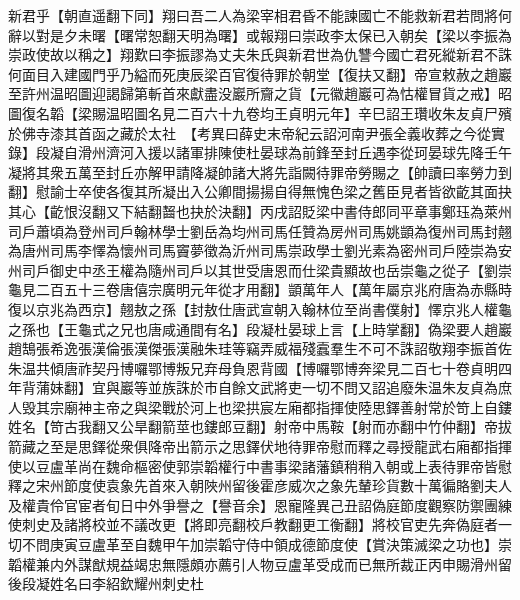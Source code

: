 新君乎【朝直遥翻下同】翔曰吾二人為梁宰相君昏不能諫國亡不能救新君若問將何辭以對是夕未曙【曙常恕翻天明為曙】或報翔曰崇政李太保已入朝矣【梁以李振為崇政使故以稱之】翔歎曰李振謬為丈夫朱氏與新君世為仇讐今國亡君死縱新君不誅何面目入建國門乎乃縊而死庚辰梁百官復待罪於朝堂【復扶又翻】帝宣敕赦之趙巖至許州温昭圖迎謁歸第斬首來獻盡没巖所齎之貨【元徽趙巖可為怙權冒貨之戒】昭圖復名韜【梁賜温昭圖名見二百六十九卷均王貞明元年】辛巳詔王瓚收朱友貞尸殯於佛寺漆其首函之藏於太社　【考異曰薛史末帝紀云詔河南尹張全義收葬之今從實錄】段凝自滑州濟河入援以諸軍排陳使杜晏球為前鋒至封丘遇李從珂晏球先降壬午凝將其衆五萬至封丘亦解甲請降凝帥諸大將先詣闕待罪帝勞賜之【帥讀曰率勞力到翻】慰諭士卒使各復其所凝出入公卿間揚揚自得無愧色梁之舊臣見者皆欲齕其面抉其心【齕恨沒翻又下結翻齧也抉於決翻】丙戌詔貶梁中書侍郎同平章事鄭珏為萊州司戶蕭頃為登州司戶翰林學士劉岳為均州司馬任贊為房州司馬姚顗為復州司馬封翹為唐州司馬李懌為懷州司馬竇夢徵為沂州司馬崇政學士劉光素為密州司戶陸崇為安州司戶御史中丞王權為隨州司戶以其世受唐恩而仕梁貴顯故也岳崇龜之從子【劉崇龜見二百五十三卷唐僖宗廣明元年從才用翻】顗萬年人【萬年屬京兆府唐為赤縣時復以京兆為西京】翹敖之孫【封敖仕唐武宣朝入翰林位至尚書僕射】懌京兆人權龜之孫也【王龜式之兄也唐咸通間有名】段凝杜晏球上言【上時掌翻】偽梁要人趙巖趙鵠張希逸張漢倫張漢傑張漢融朱珪等竊弄威福殘蠧羣生不可不誅詔敬翔李振首佐朱温共傾唐祚契丹博囉鄂博叛兄弃母負恩背國【博囉鄂博奔梁見二百七十卷貞明四年背蒲妹翻】宜與巖等並族誅於市自餘文武將吏一切不問又詔追廢朱温朱友貞為庶人毁其宗廟神主帝之與梁戰於河上也梁拱宸左廂都指揮使陸思鐸善射常於笴上自鏤姓名【笴古我翻又公旱翻箭莖也鏤郎豆翻】射帝中馬鞍【射而亦翻中竹仲翻】帝拔箭藏之至是思鐸從衆俱降帝出箭示之思鐸伏地待罪帝慰而釋之尋授龍武右廂都指揮使以豆盧革尚在魏命樞密使郭崇韜權行中書事梁諸藩鎮稍稍入朝或上表待罪帝皆慰釋之宋州節度使袁象先首來入朝陜州留後霍彦威次之象先輦珍貨數十萬徧賂劉夫人及權貴伶官宦者旬日中外爭譽之【譽音余】恩寵隆異己丑詔偽庭節度觀察防禦團練使刺史及諸將校並不議改更【將即亮翻校戶教翻更工衡翻】將校官吏先奔偽庭者一切不問庚寅豆盧革至自魏甲午加崇韜守侍中領成德節度使【賞決策滅梁之功也】崇韜權兼内外謀猷規益竭忠無隱頗亦薦引人物豆盧革受成而已無所裁正丙申賜滑州留後段凝姓名曰李紹欽耀州刺史杜

